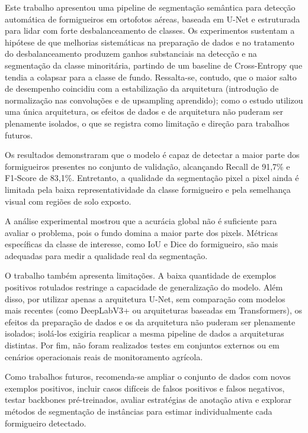 \documentclass[10pt,a4paper,twocolumn]{article}
\begin{document}
Este trabalho apresentou uma pipeline de segmentação semântica para detecção automática de formigueiros em ortofotos aéreas, baseada em U-Net e estruturada para lidar com forte desbalanceamento de classes. Os experimentos sustentam a hipótese de que melhorias sistemáticas na preparação de dados e no tratamento do desbalanceamento produzem ganhos substanciais na detecção e na segmentação da classe minoritária, partindo de um baseline de Cross-Entropy que tendia a colapsar para a classe de fundo. Ressalta-se, contudo, que o maior salto de desempenho coincidiu com a estabilização da arquitetura (introdução de normalização nas convoluções e de upsampling aprendido); como o estudo utilizou uma única arquitetura, os efeitos de dados e de arquitetura não puderam ser plenamente isolados, o que se registra como limitação e direção para trabalhos futuros.

Os resultados demonstraram que o modelo é capaz de detectar a maior parte dos formigueiros presentes no conjunto de validação, alcançando Recall de 91,7\% e F1-Score de 83,1\%. Entretanto, a qualidade da segmentação pixel a pixel ainda é limitada pela baixa representatividade da classe formigueiro e pela semelhança visual com regiões de solo exposto.

A análise experimental mostrou que a acurácia global não é suficiente para avaliar o problema, pois o fundo domina a maior parte dos pixels. Métricas específicas da classe de interesse, como IoU e Dice do formigueiro, são mais adequadas para medir a qualidade real da segmentação.

O trabalho também apresenta limitações. A baixa quantidade de exemplos positivos rotulados restringe a capacidade de generalização do modelo. Além disso, por utilizar apenas a arquitetura U-Net, sem comparação com modelos mais recentes (como DeepLabV3+ ou arquiteturas baseadas em Transformers), os efeitos da preparação de dados e os da arquitetura não puderam ser plenamente isolados; isolá-los exigiria reaplicar a mesma pipeline de dados a arquiteturas distintas. Por fim, não foram realizados testes em conjuntos externos ou em cenários operacionais reais de monitoramento agrícola.

Como trabalhos futuros, recomenda-se ampliar o conjunto de dados com novos exemplos positivos, incluir casos difíceis de falsos positivos e falsos negativos, testar backbones pré-treinados, avaliar estratégias de anotação ativa e explorar métodos de segmentação de instâncias para estimar individualmente cada formigueiro detectado.
\end{document}

